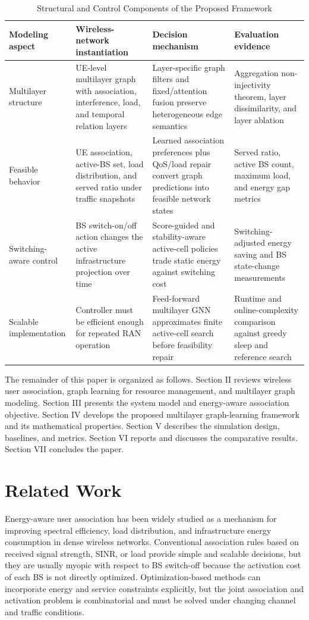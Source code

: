 \documentclass[journal]{IEEEtran}
\begin{document}
\begin{table}[!t]
\caption{Structural and Control Components of the Proposed Framework}
\label{tab:framework_components}
\centering
\small
\setlength{\tabcolsep}{4pt}
\begin{tabular}{p{}p{}p{}p{}}
\toprule
Modeling aspect & Wireless-network instantiation & Decision mechanism & Evaluation evidence \\
\midrule
Multilayer structure & UE-level multilayer graph with association, interference, load, and temporal relation layers & Layer-specific graph filters and fixed/attention fusion preserve heterogeneous edge semantics & Aggregation non-injectivity theorem, layer dissimilarity, and layer ablation \\
Feasible behavior & UE association, active-BS set, load distribution, and served ratio under traffic snapshots & Learned association preferences plus QoS/load repair convert graph predictions into feasible network states & Served ratio, active BS count, maximum load, and energy gap metrics \\
Switching-aware control & BS switch-on/off action changes the active infrastructure projection over time & Score-guided and stability-aware active-cell policies trade static energy against switching cost & Switching-adjusted energy saving and BS state-change measurements \\
Scalable implementation & Controller must be efficient enough for repeated RAN operation & Feed-forward multilayer GNN approximates finite active-cell search before feasibility repair & Runtime and online-complexity comparison against greedy sleep and reference search \\
\bottomrule
\end{tabular}
\end{table}

The remainder of this paper is organized as follows. Section II reviews
wireless user association, graph learning for resource management, and
multilayer graph modeling. Section III presents the system model and
energy-aware association objective. Section IV develops the proposed multilayer
graph-learning framework and its mathematical properties. Section V describes
the simulation design, baselines, and metrics. Section VI reports and discusses
the comparative results. Section VII concludes the paper.

\section{Related Work}
Energy-aware user association has been widely studied as a mechanism for
improving spectral efficiency, load distribution, and infrastructure energy
consumption in dense wireless networks. Conventional association rules based on
received signal strength, SINR, or load provide simple and scalable decisions,
but they are usually myopic with respect to BS switch-off because the
activation cost of each BS is not directly optimized. Optimization-based
methods can incorporate energy and service constraints explicitly, but the
joint association and activation problem is combinatorial and must be solved
under changing channel and traffic conditions.
\end{document}
